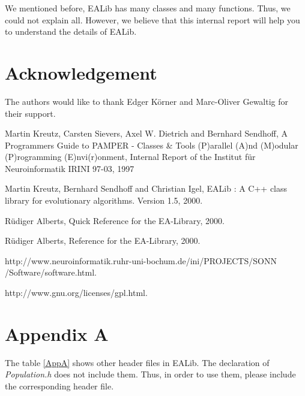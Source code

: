 \documentclass[twocolumn]{article}
\begin{document}
\noindent
We mentioned before, EALib has many classes and many functions. Thus, we
could not explain all. However, we believe that this internal report
will help you to understand the details of EALib.

\section*{Acknowledgement}

\noindent
The authors would like to thank Edger K\"{o}rner and Marc-Oliver Gewaltig for
their support.

\begin{thebibliography}{99}

Martin Kreutz, Carsten Sievers, Axel W. Dietrich and Bernhard
Sendhoff, A  Programmers Guide to PAMPER - Classes \& Tools (P)arallel
(A)nd (M)odular (P)rogramming (E)nvi(r)onment, Internal Report of the
Institut f\"{u}r Neuroinformatik IRINI 97-03, 1997


Martin Kreutz, Bernhard Sendhoff and Christian Igel, EALib : A C++
class library for evolutionary algorithms. Version 1.5, 2000.

R\"{u}diger Alberts, Quick Reference for the EA-Library, 2000.

R\"{u}diger Alberts, Reference for the EA-Library, 2000.

http://www.neuroinformatik.ruhr-uni-bochum.de/ini/PROJECTS/SONN
/Software/software.html.

http://www.gnu.org/licenses/gpl.html.


\end{thebibliography}

\clearpage


\section*{Appendix A}

\noindent
The table \ref{AppA} shows other header files in EALib. The
declaration of {\em Population.h} does not include them. Thus,
in order to use them, please include the corresponding header file.
\end{document}
